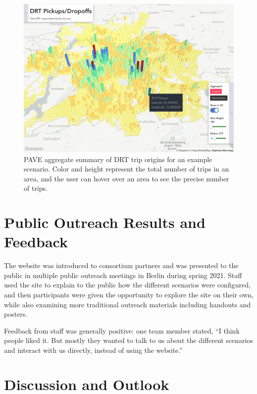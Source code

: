 \begin{figure}[ht]
\centering
  \includegraphics[width=0.95\linewidth]{chapters/23-pave/images/fig-xy-origins.png}
\caption{PAVE aggregate summary of DRT trip origins for an example scenario. Color and height represent the total number of trips in an area, and the user can hover over an area to see the precise number of trips.}
\label{fig:pave-xy-origins}
\end{figure}

\section{Public Outreach Results and Feedback}
\label{pave-feedback}

The website was introduced to consortium partners and was presented to the public in multiple public outreach meetings in Berlin during spring 2021. Staff used the site to explain to the public how the different scenarios were configured, and then participants were given the opportunity to explore the site on their own, while also examining more traditional outreach materials including handouts and posters.

Feedback from staff was generally positive: one team member stated, ``I think people liked it. But mostly they wanted to talk to us about the different scenarios and interact with us directly, instead of using the website.''

\section{Discussion and Outlook}
\label{pave-discussion}

